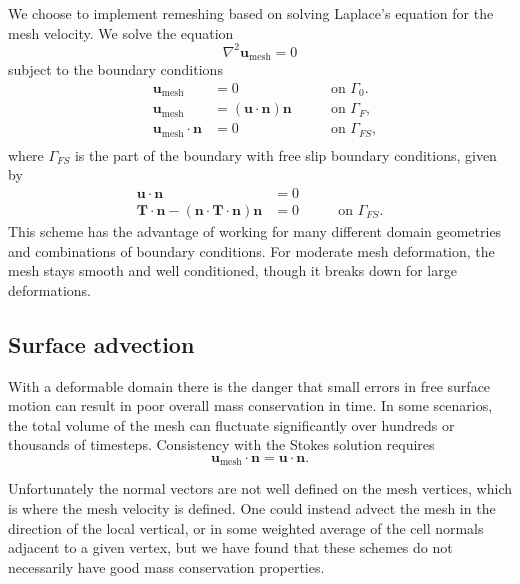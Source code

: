 \documentclass[preprint,12pt,authoryear]{elsarticle}
\begin{document}
We choose to implement remeshing based on solving Laplace's equation for the mesh velocity.
We solve the equation
\begin{equation}
\nabla^2 \mathbf{u}_{\mathrm{mesh}} = 0
\label{eq:laplacian_smoothing}
\end{equation}
subject to the boundary conditions
\begin{equation}
\begin{aligned}
&\mathbf{u}_\mathrm{mesh} &= 0  &\qquad \textrm{on } \Gamma_0. \\
&\mathbf{u}_\mathrm{mesh} &= \left( \textbf{u} \cdot \textbf{n} \right) \textbf{n} & \qquad \textrm{on } \Gamma_F, \\
&\mathbf{u}_\mathrm{mesh} \cdot \textbf{n} &= 0  &\qquad \textrm{on } \Gamma_{FS}, \\
\end{aligned}
\label{eq:laplacian_bcs}
\end{equation}
where $\Gamma_{FS}$ is the part of the boundary with free slip boundary conditions, given by
\begin{equation}
\begin{aligned}
 \mathbf{u \cdot n} &= 0 \\ %
 \mathbf{T}\cdot \mathbf{n} - (\mathbf{n}\cdot\mathbf{T} \cdot \mathbf{n})\mathbf{n} &= 0 &\qquad \textrm{on } \Gamma_{FS}.
\end{aligned}
\label{eq:free_slip_bcs}
\end{equation}
This scheme has the advantage of working for many different domain geometries and combinations of boundary conditions.
For moderate mesh deformation, the mesh stays smooth and well conditioned, though it breaks down for large deformations.

\subsection{Surface advection}
With a deformable domain there is the danger that small errors in free surface motion can
result in poor overall mass conservation in time. In some scenarios, the total volume of the mesh can 
fluctuate significantly over hundreds or thousands of timesteps.
Consistency with the Stokes solution requires 
\begin{equation}
\mathbf{u}_{\mathrm{mesh}} \cdot \mathbf{n} = \mathbf{u \cdot n}.
\end{equation}

Unfortunately the normal vectors are not well defined on the mesh vertices, which is 
where the mesh velocity is defined. One could instead advect the mesh in the direction 
of the local vertical, or in some weighted average of the cell normals adjacent to a given vertex,
but we have found that these schemes do not necessarily have good mass conservation 
properties.
\end{document}
